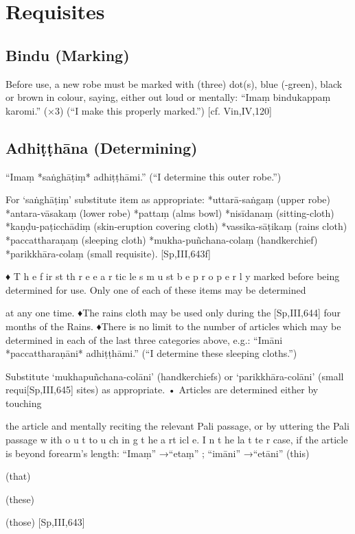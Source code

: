 \chapter{Requisites}

\section{Bindu (Marking)}

Before use, a new robe must be marked with
(three) dot(s), blue (-green), black or brown
in colour, saying, either out loud or mentally:
“Imaṃ bindukappaṃ karomi.” (×3)
(“I make this properly marked.”)
[cf. Vin,IV,120]

\section{Adhiṭṭhāna (Determining)}

“Imaṃ *saṅghāṭiṃ* adhiṭṭhāmi.”
(“I determine this outer robe.”)

For ‘saṅghāṭiṃ’ substitute item as appropriate:
*uttarā-saṅgaṃ (upper robe)
*antara-vāsakaṃ (lower robe)
*pattaṃ (alms bowl)
*nisīdanaṃ (sitting-cloth)
*kaṇḍu-paṭicchādiṃ (skin-eruption covering cloth)
*vassika-sāṭikaṃ (rains cloth)
*paccattharaṇaṃ (sleeping cloth)
*mukha-puñchana-colaṃ (handkerchief)
*parikkhāra-colaṃ (small requisite). [Sp,III,643f]

♦ T h e f ir st th r e e a r tic le s m u st b e p r o p e r l y
marked before being determined for use. Only
one of each of these items may be determined

at any one time.
♦The rains cloth may be used only during the
[Sp,III,644]
four months of the Rains.
♦There is no limit to the number of articles
which may be determined in each of the last
three categories above, e.g.:
“Imāni *paccattharaṇāni* adhiṭṭhāmi.”
(“I determine these sleeping cloths.”)

Substitute ‘mukhapuñchana-colāni’ (handkerchiefs) or ‘parikkhāra-colāni’ (small requi[Sp,III,645]
sites) as appropriate.
• Articles are determined either by touching

the article and mentally reciting the relevant
Pali passage, or by uttering the Pali passage
w ith o u t to u ch in g t he a rt icl e. I n t he la t te r
case, if the article is beyond forearm’s length:
“Imaṃ” →“etaṃ” ; “imāni” →“etāni”
(this)

(that)

(these)

(those)
[Sp,III,643]

